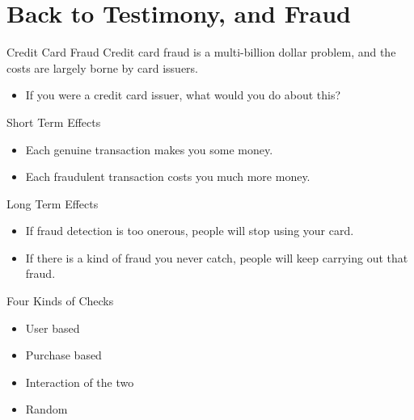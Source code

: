 \documentclass[
  17pt,
  letterpaper,
  ignorenonframetext,
  aspectratio=169,
]{beamer}
\providecommand{\tightlist}{%
  \setlength{\itemsep}{0pt}\setlength{\parskip}{0pt}}\usepackage{longtable,booktabs,array}
\begin{document}
\hypertarget{back-to-testimony-and-fraud}{%
\section{Back to Testimony, and
Fraud}\label{back-to-testimony-and-fraud}}

\begin{frame}{Credit Card Fraud}
\protect\hypertarget{credit-card-fraud}{}
Credit card fraud is a multi-billion dollar problem, and the costs are
largely borne by card issuers.

\begin{itemize}[<+->]
\tightlist
\item
  If you were a credit card issuer, what would you do about this?
\end{itemize}
\end{frame}

\begin{frame}{Short Term Effects}
\protect\hypertarget{short-term-effects}{}
\begin{itemize}[<+->]
\tightlist
\item
  Each genuine transaction makes you some money.
\item
  Each fraudulent transaction costs you much more money.
\end{itemize}
\end{frame}

\begin{frame}{Long Term Effects}
\protect\hypertarget{long-term-effects}{}
\begin{itemize}[<+->]
\tightlist
\item
  If fraud detection is too onerous, people will stop using your card.
\item
  If there is a kind of fraud you never catch, people will keep carrying
  out that fraud.
\end{itemize}
\end{frame}

\begin{frame}{Four Kinds of Checks}
\protect\hypertarget{four-kinds-of-checks}{}
\begin{itemize}[<+->]
\tightlist
\item
  User based
\item
  Purchase based
\item
  Interaction of the two
\item
  Random
\end{itemize}
\end{frame}
\end{document}

